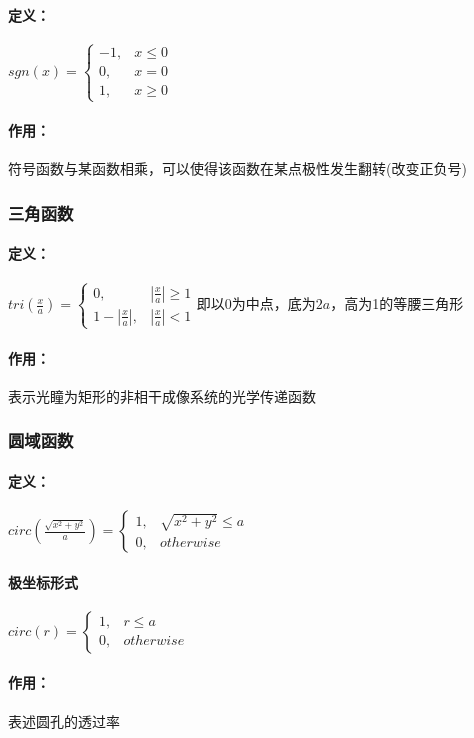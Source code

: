 \documentclass[UTF8]{ctexart}
\newcommand{\f}[2]{\frac{#1}{#2}}%
\begin{document}
\paragraph{定义：}
$sgn(x)=
\begin{cases}
-1,  & x\le0\\
 0,  & x=0 \\
 1,  & x\ge0   
\end{cases}$
\paragraph{作用：}符号函数与某函数相乘，可以使得该函数在某点极性发生翻转(改变正负号)
\subsubsection{三角函数}
\paragraph{定义：}
$
tri(\f{x}{a})=
\begin{cases}
0, & |\f{x}{a}|\ge 1 \\
1-|\f{x}{a}|, &|\f{x}{a}|<1 
\end{cases}
$即以0为中点，底为$2a$，高为1的等腰三角形
\paragraph{作用：}表示光瞳为矩形的非相干成像系统的光学传递函数
\subsubsection{圆域函数}
\paragraph{定义：}
$circ(\f{\sqrt{x^2+y^2}}{a})=
\begin{cases}
    1,&\sqrt{x^2+y^2}\le a\\
    0,&otherwise
\end{cases}$
\paragraph{极坐标形式}$circ(r)=
\begin{cases}
    1,&r\le a\\
    0,&otherwise
\end{cases}
$
\paragraph{作用：}表述圆孔的透过率
\end{document}
